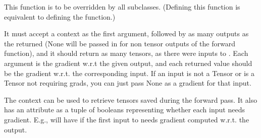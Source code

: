 \documentclass[letterpaper,10pt,english]{sphinxmanual}
\begin{document}
\begin{fulllineitems}
\begin{fulllineitems}
\sphinxAtStartPar
This function is to be overridden by all subclasses.
(Defining this function is equivalent to defining the  function.)

\sphinxAtStartPar
It must accept a context  as the first argument, followed by
as many outputs as the {\hyperref[\detokenize{dtw_loss_functions.soft_dtw_implementations.soft_dtw_cuda_ron.autograd_xy:dtw_loss_functions.soft_dtw_implementations.soft_dtw_cuda_ron.autograd_xy.SoftDTWXYAutograd.forward}]{}} returned (None will be passed in
for non tensor outputs of the forward function),
and it should return as many tensors, as there were inputs to
{\hyperref[\detokenize{dtw_loss_functions.soft_dtw_implementations.soft_dtw_cuda_ron.autograd_xy:dtw_loss_functions.soft_dtw_implementations.soft_dtw_cuda_ron.autograd_xy.SoftDTWXYAutograd.forward}]{}}. Each argument is the gradient w.r.t the given output,
and each returned value should be the gradient w.r.t. the
corresponding input. If an input is not a Tensor or is a Tensor not
requiring grads, you can just pass None as a gradient for that input.

\sphinxAtStartPar
The context can be used to retrieve tensors saved during the forward
pass. It also has an attribute  as a tuple
of booleans representing whether each input needs gradient. E.g.,
{\hyperref[\detokenize{dtw_loss_functions.soft_dtw_implementations.soft_dtw_cuda_ron.autograd_xy:dtw_loss_functions.soft_dtw_implementations.soft_dtw_cuda_ron.autograd_xy.SoftDTWXYAutograd.backward}]{}} will have  if the
first input to {\hyperref[\detokenize{dtw_loss_functions.soft_dtw_implementations.soft_dtw_cuda_ron.autograd_xy:dtw_loss_functions.soft_dtw_implementations.soft_dtw_cuda_ron.autograd_xy.SoftDTWXYAutograd.forward}]{}} needs gradient computed w.r.t. the
output.

\end{fulllineitems}



\end{fulllineitems}
\end{document}
